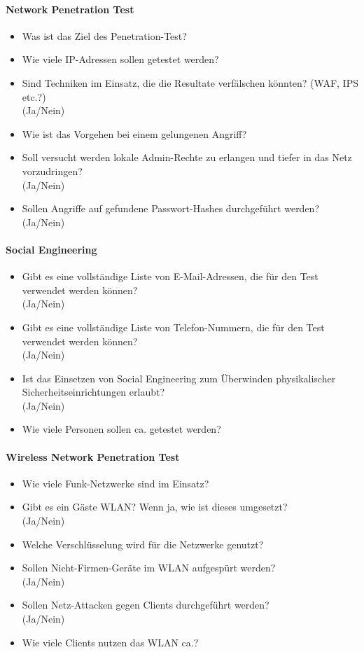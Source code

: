 \paragraph{Network Penetration Test}
\begin{itemize}
	\item Was ist das Ziel des Penetration-Test?
	\item Wie viele IP-Adressen sollen getestet werden?
	\item Sind Techniken im Einsatz, die die Resultate verfälschen könnten? (WAF, IPS etc.?)\\
	(Ja/Nein)
	\item Wie ist das Vorgehen bei einem gelungenen Angriff?
	\item Soll versucht werden lokale Admin-Rechte zu erlangen und tiefer in das Netz vorzudringen?\\
	(Ja/Nein)
	\item Sollen Angriffe auf gefundene Passwort-Hashes durchgeführt werden?\\
	(Ja/Nein)
\end{itemize}

\paragraph{Social Engineering}
\begin{itemize}
	\item Gibt es eine vollständige Liste von E-Mail-Adressen, die für den Test verwendet werden können?\\
	(Ja/Nein)
	\item Gibt es eine vollständige Liste von Telefon-Nummern, die für den Test verwendet werden können?\\
	(Ja/Nein)
	\item Ist das Einsetzen von Social Engineering zum Überwinden physikalischer Sicherheitseinrichtungen erlaubt?\\
	(Ja/Nein)
	\item Wie viele Personen sollen ca. getestet werden?
\end{itemize}

\paragraph{Wireless Network Penetration Test}
\begin{itemize}
	\item Wie viele Funk-Netzwerke sind im Einsatz?
	\item Gibt es ein Gäste WLAN? Wenn ja, wie ist dieses umgesetzt?\\
	(Ja/Nein)
	\item Welche Verschlüsselung wird für die Netzwerke genutzt?
	\item Sollen Nicht-Firmen-Geräte im WLAN aufgespürt werden?\\
	(Ja/Nein)
	\item Sollen Netz-Attacken gegen Clients durchgeführt werden?\\
	(Ja/Nein)
	\item Wie viele Clients nutzen das WLAN ca.?
\end{itemize}

